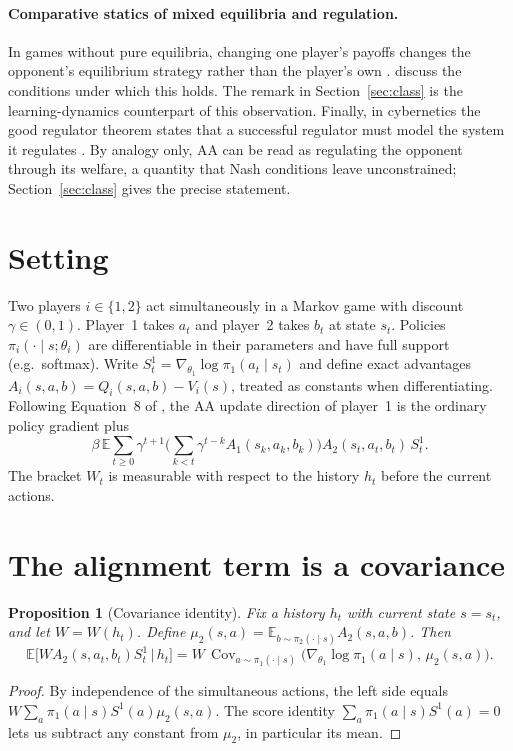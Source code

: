 \documentclass[11pt]{article}
\newtheorem{proposition}{Proposition}
\theoremstyle{remark}
\DeclareMathOperator{\Cov}{Cov}
\newcommand{\E}{\mathbb{E}}
\begin{document}
\paragraph{Comparative statics of mixed equilibria and regulation.} In games without pure equilibria, changing one player's payoffs changes the opponent's equilibrium strategy rather than the player's own \citep{tsebelis1989}. \citet{weissing1991} discuss the conditions under which this holds. The remark in Section~\ref{sec:class} is the learning-dynamics counterpart of this observation. Finally, in cybernetics the good regulator theorem states that a successful regulator must model the system it regulates \citep{conant1970regulator}. By analogy only, AA can be read as regulating the opponent through its welfare, a quantity that Nash conditions leave unconstrained; Section~\ref{sec:class} gives the precise statement.

\section{Setting}

Two players $i\in\{1,2\}$ act simultaneously in a Markov game with discount $\gamma\in(0,1)$. Player~1 takes $a_t$ and player~2 takes $b_t$ at state $s_t$. Policies $\pi_i(\cdot\mid s;\theta_i)$ are differentiable in their parameters and have full support (e.g.\ softmax). Write $S^1_t=\nabla_{\theta_1}\log\pi_1(a_t\mid s_t)$ and define exact advantages $A_i(s,a,b)=Q_i(s,a,b)-V_i(s)$, treated as constants when differentiating. Following Equation~8 of \citet{duque2025aa}, the AA update direction of player~1 is the ordinary policy gradient plus
\begin{equation}\label{eq:aa}
\beta\,\E\sum_{t\ge 0}\gamma^{t+1}\Big(\sum_{k<t}\gamma^{t-k}A_1(s_k,a_k,b_k)\Big)A_2(s_t,a_t,b_t)\,S^1_t .
\end{equation}
The bracket $W_t$ is measurable with respect to the history $h_t$ before the current actions.

\section{The alignment term is a covariance}\label{sec:cov}

\begin{proposition}[Covariance identity]\label{prop:cov}
Fix a history $h_t$ with current state $s=s_t$, and let $W=W(h_t)$. Define
$\mu_2(s,a)=\E_{b\sim\pi_2(\cdot\mid s)}A_2(s,a,b)$. Then
\[
\E\big[W A_2(s,a_t,b_t) S^1_t \,\big|\, h_t\big]
= W\,\Cov_{a\sim\pi_1(\cdot\mid s)}\big(\nabla_{\theta_1}\log\pi_1(a\mid s),\,\mu_2(s,a)\big).
\]
\end{proposition}
\begin{proof}
By independence of the simultaneous actions, the left side equals
$W\sum_a\pi_1(a\mid s)S^1(a)\mu_2(s,a)$. The score identity
$\sum_a\pi_1(a\mid s)S^1(a)=0$ lets us subtract any constant from $\mu_2$, in particular its mean.
\end{proof}
\end{document}

